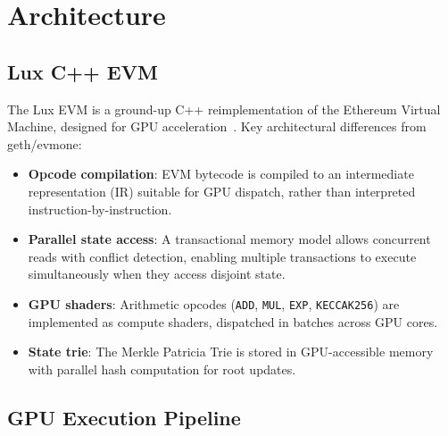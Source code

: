 \section{Architecture}

\label{sec:architecture}

\subsection{Lux C++ EVM}

The Lux EVM is a ground-up C++ reimplementation of the Ethereum Virtual Machine, designed for GPU acceleration~\cite{lux-evmgpu-benchmark}. Key architectural differences from geth/evmone:

\begin{itemize}
    \item \textbf{Opcode compilation}: EVM bytecode is compiled to an intermediate representation (IR) suitable for GPU dispatch, rather than interpreted instruction-by-instruction.
    \item \textbf{Parallel state access}: A transactional memory model allows concurrent reads with conflict detection, enabling multiple transactions to execute simultaneously when they access disjoint state.
    \item \textbf{GPU shaders}: Arithmetic opcodes (\texttt{ADD}, \texttt{MUL}, \texttt{EXP}, \texttt{KECCAK256}) are implemented as compute shaders, dispatched in batches across GPU cores.
    \item \textbf{State trie}: The Merkle Patricia Trie is stored in GPU-accessible memory with parallel hash computation for root updates.
\end{itemize}

\subsection{GPU Execution Pipeline}

